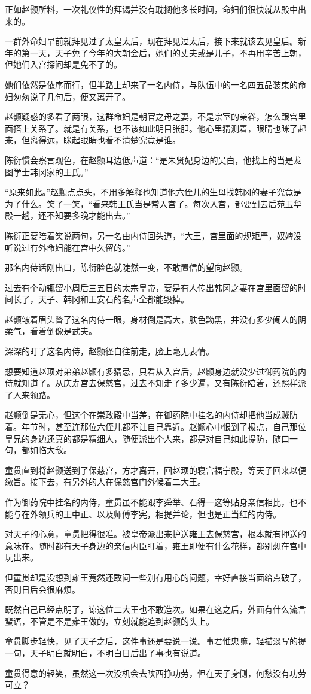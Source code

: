 正如赵颢所料，一次礼仪性的拜谒并没有耽搁他多长时间，命妇们很快就从殿中出来的。

一群外命妇早前就拜见过了太皇太后，现在拜见过太后，接下来就该去见皇后。新年的第一天，天子免了今年的大朝会后，她们的丈夫或是儿子，不再用辛苦上朝，但她们入宫探问却是免不了的。

她们依然是依序而行，但半路上却来了一名内侍，与队伍中的一名四五品装束的命妇匆匆说了几句后，便又离开了。

赵颢疑惑的多看了两眼，这群命妇是朝官之母之妻，不是宗室的亲眷，怎么跟宫里面搭上关系了。就是有关系，也不该如此明目张胆。他心里猜测着，眼睛也眯了起来，但离得远，眯起眼睛也看不清楚究竟是谁。

陈衍惯会察言观色，在赵颢耳边低声道：“是朱贤妃身边的吴白，他找上的当是龙图学士韩冈家的王氏。”

“原来如此。”赵颢点点头，不用多解释也知道他六侄儿的生母找韩冈的妻子究竟是为了什么。笑了一笑，“看来韩王氏当是常入宫了。每次入宫，都要到去后苑玉华殿一趟，还不知要多晚才能出去。”

陈衍正要陪着笑说两句，另一名由内侍回头道，“大王，宫里面的规矩严，奴婢没听说过有外命妇能在宫中久留的。”

那名内侍话刚出口，陈衍脸色就陡然一变，不敢置信的望向赵颢。

过去有个动辄留小周后三五日的太宗皇帝，要是有人传出韩冈之妻在宫里面留的时间长了，天子、韩冈和王安石的名声全都能毁掉。

赵颢皱着眉头瞥了这名内侍一眼，身材倒是高大，肤色黝黑，并没有多少阉人的阴柔气，看着倒像是武夫。

深深的盯了这名内侍，赵颢径自往前走，脸上毫无表情。

想要知道赵顼对弟弟赵颢有多猜忌，只看从入宫后，赵颢身边就没少过御药院的内侍就知道了。从庆寿宫去保慈宫，过去不知走了多少遍，又有陈衍陪着，还照样派了人来领路。

赵颢倒是无心，但这个在崇政殿中当差，在御药院中挂名的内侍却把他当成贼防着。年节时，甚至连那位六侄儿都不让自己靠近。赵颢心中恨到了极点，自己那位皇兄的身边还真的都是精细人，随便派出个人来，都是对自己如此提防，随口一句，都如临大敌。

童贯直到将赵颢送到了保慈宫，方才离开，回赵顼的寝宫福宁殿，等天子回来以便缴旨。接下去，有另外的人在保慈宫门外候着二大王。

作为御药院中挂名的内侍，童贯虽不能跟李舜举、石得一这等贴身亲信相比，也不能与在外领兵的王中正、以及师傅李宪，相提并论，但也是正当红的内侍。

对天子的心意，童贯把得很准。被皇帝派出来护送雍王去保慈宫，根本就有押送的意味在。随时都有天子身边的亲信内臣盯着，雍王即便有什么花样，都别想在宫中玩出来。

但童贯却是没想到雍王竟然还敢问一些别有用心的问题，幸好直接当面给点破了，否则日后会很麻烦。

既然自己已经点明了，谅这位二大王也不敢造次。如果在这之后，外面有什么流言蜚语，不管是不是雍王做的，立刻就能追到赵颢的头上。

童贯脚步轻快，见了天子之后，这件事还是要说一说。事君惟忠嘛，轻描淡写的提一句，天子明白就明白，不明白日后出了事也有说道。

童贯得意的轻笑，虽然这一次没机会去陕西挣功劳，但在天子身侧，何愁没有功劳可立？

